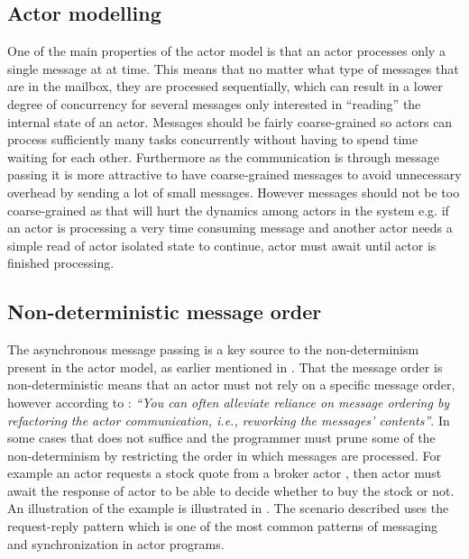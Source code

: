 \subsection{Actor modelling}\label{ssec:actor_modelling}
One of the main properties of the actor model is that an actor processes only a single message at at time. This means that no matter what type of messages that are in the mailbox, they are processed sequentially, which can result in a lower degree of concurrency for several messages only interested in ``reading'' the internal state of an actor. Messages should be fairly coarse-grained so actors can process sufficiently many tasks concurrently without having to spend time waiting for each other\cite[p. 269]{karmani2009actor}. Furthermore as the communication is through message passing it is more attractive to have coarse-grained messages to avoid unnecessary overhead by sending a lot of small messages. However messages should not be too coarse-grained as that will hurt the dynamics among actors in the system e.g. if an actor  is processing a very time consuming message and another actor  needs a simple read of actor  isolated state to continue, actor  must await until actor  is finished processing.

\subsection{Non-deterministic message order}\label{ssec:nondeter_msg_order}
The asynchronous message passing is a key source to the non-determinism present in the actor model, as earlier mentioned in . That the message order is non-deterministic means that an actor must not rely on a specific message order, however according to \cite[p. 35]{haller2012actors}: \textit{``You can often alleviate reliance on message ordering by refactoring the actor communication, i.e., reworking the messages' contents''}. In some cases that does not suffice and the programmer must prune some of the non-determinism by restricting the order in which messages are processed. For example an actor  requests a stock quote from a broker actor , then actor  must await the response of actor  to be able to decide whether to buy the stock or not. An illustration of the example is illustrated in . The scenario described uses the request-reply pattern which is one of the most common patterns of messaging and synchronization in actor programs\cite[p. 5]{karmani2009actor}.

